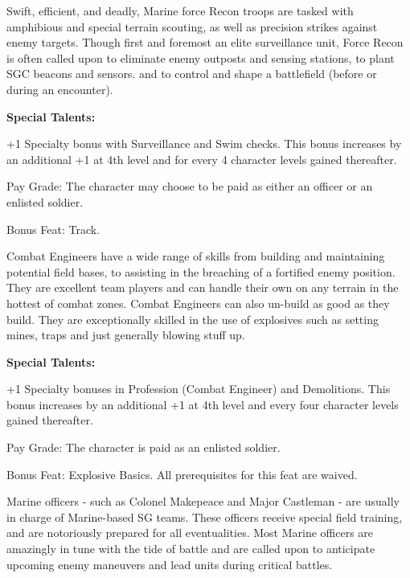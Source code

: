 Swift, efficient, and deadly, Marine force Recon troops are tasked with amphibious and special terrain scouting, as well as precision strikes against enemy targets. Though first and foremost an elite surveillance unit, Force Recon is often called upon to eliminate enemy outposts and sensing stations, to plant SGC beacons and sensors. and to control and shape a battlefield (before or during an encounter).

\textbf{Special Talents:}
\begin{itemize*}
\item +1 Specialty bonus with Surveillance and Swim checks. This bonus increases by an additional +1 at 4th level and for every 4 character levels gained thereafter.
\item Pay Grade: The character may choose to be paid as either an officer or an enlisted soldier.
\item Bonus Feat: Track.
\end{itemize*}

Combat Engineers have a wide range of skills from building and maintaining potential field bases, to assisting in the breaching of a fortified enemy position.  They are excellent team players and can handle their own on any terrain in the hottest of combat zones.  Combat Engineers can also un-build as good as they build.  They are exceptionally skilled in the use of explosives such as setting mines, traps and just generally blowing stuff up.

\textbf{Special Talents:}
\begin{itemize*}
\item +1 Specialty bonuses in Profession (Combat Engineer) and Demolitions.  This bonus increases by an additional +1 at 4th level and every four character levels gained thereafter.
\item Pay Grade: The character is paid as an enlisted soldier.
\item Bonus Feat: Explosive Basics.  All prerequisites for this feat are waived.
\end{itemize*}

Marine officers - such as Colonel Makepeace and Major Castleman - are usually in charge of Marine-based SG teams. These officers receive special field training, and are notoriously prepared for all eventualities. Most Marine officers are amazingly in tune with the tide of battle and are called upon to anticipate upcoming enemy maneuvers and lead units during critical battles.

